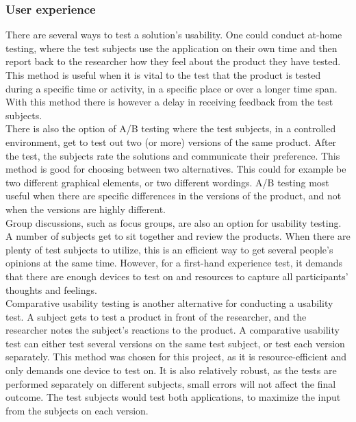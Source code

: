 \subsubsection{User experience}
There are several ways to test a solution’s usability. One could conduct at-home testing, where the test subjects use the application on their own time and then report back to the researcher how they feel about the product they have tested. This method is useful when it is vital to the test that the product is tested during a specific time or activity, in a specific place or over a longer time span. With this method there is however a delay in receiving feedback from the test subjects. \\
There is also the option of A/B testing where the test subjects, in a controlled environment, get to test out two (or more) versions of the same product. After the test, the subjects rate the solutions and communicate their preference. This method is good for choosing between two alternatives. This could for example be two different graphical elements, or two different wordings. A/B testing most useful when there are specific differences in the versions of the product, and not when the versions are highly different. \\
Group discussions, such as focus groups, are also an option for usability testing. A number of subjects get to sit together and review the products. When there are plenty of test subjects to utilize, this is an efficient way to get several people’s opinions at the same time. However, for a first-hand experience test, it demands that there are enough devices to test on and resources to capture all participants’ thoughts and feelings. \\
Comparative usability testing is another alternative for conducting a usability test. A subject gets to test a product in front of the researcher, and the researcher notes the subject’s reactions to the product. A comparative usability test can either test several versions on the same test subject, or test each version separately. This method was chosen for this project, as it is resource-efficient and only demands one device to test on. It is also relatively robust, as the tests are performed separately on different subjects, small errors will not affect the final outcome. The test subjects would test both applications, to maximize the input from the subjects on each version.

